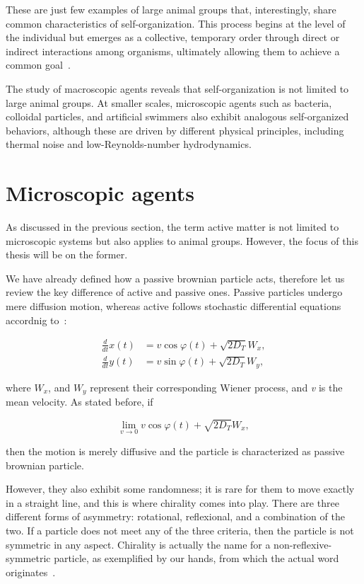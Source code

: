 These are just few examples of large animal groups that, interestingly, share common characteristics of self-organization. This process begins at the level of the individual but emerges as a collective, temporary order through direct or indirect interactions among organisms, ultimately allowing them to achieve a common goal~\cite{isaeva2012self}.

The study of macroscopic agents reveals that self-organization is not limited to large animal groups. At smaller scales, microscopic agents such as bacteria, colloidal particles, and artificial swimmers also exhibit analogous self-organized behaviors, although these are driven by different physical principles, including thermal noise and low-Reynolds-number hydrodynamics.

\section{Microscopic agents}

As discussed in the previous section, the term active matter is not limited to microscopic systems but also applies to animal groups. However, the focus of this thesis will be on the former.

We have already defined how a passive brownian particle acts, therefore let us review the key difference of active and passive ones. Passive particles undergo mere diffusion motion, whereas active follows stochastic differential equations accordnig to~\cite{volpe2014simulation}:

\begin{align}
  \frac{d}{dt}x(t) &= v\cos{\varphi(t)} + \sqrt{2D_T}W_x,\\
  \frac{d}{dt}y(t) &= v\sin{\varphi(t)} + \sqrt{2D_T}W_y,
  \label{eq:activestochasticequation}
\end{align}

where $W_x$, and $W_y$ represent their corresponding Wiener process, and \textit{v} is the mean velocity. As stated before, if 

\begin{equation}
  \lim_{v \to 0}  v\cos{\varphi(t)} + \sqrt{2D_T}W_x,
  \label{eq:limitofvelocity}
\end{equation}

then the motion is merely diffusive and the particle is characterized as passive brownian particle. 

However, they also exhibit some randomness; it is rare for them to move exactly in a straight line, and this is where chirality comes into play. There are three different forms of asymmetry: rotational, reflexional, and a combination of the two. If a particle does not meet any of the three criteria, then the particle is not symmetric in any aspect. Chirality is actually the name for a non-reflexive-symmetric particle, as exemplified by our hands, from which the actual word originates~\cite{cahn1966specification}.

